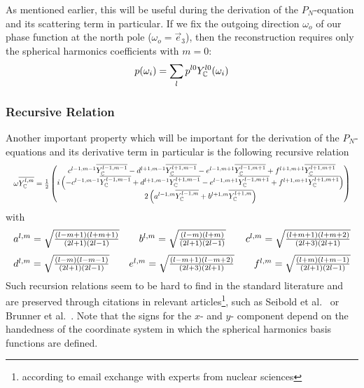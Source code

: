 As mentioned earlier, this will be useful during the derivation of the $P_N$-equation and its scattering term in particular. If we fix the outgoing direction $\omega_o$ of our phase function at the north pole ($\omega_o=\vec{e}_3$), then the reconstruction requires only the spherical harmonics coefficients with $m=0$:
\begin{align}
\label{eq:sh_exp_phase}
p(\omega_i) =
\sum_l
{
p^{l0}
Y_{\mathbb{C}}^{l0}(\omega_i)
}
\end{align}

\subsubsection*{Recursive Relation}

Another important property which will be important for the derivation of the $P_N$-equations and its derivative term in particular is the following recursive relation
\begin{equation}
\label{eq:recursive_relation}
\resizebox{1.0\hsize}{!}{$\omega\overline{\SHBC^{l,m}} = \frac{1}{2}
\begin{pmatrix}
\ c^{l-1, m-1}\overline{\SHBC^{l-1,m-1}} - d^{l+1, m-1}\overline{\SHBC^{l+1,m-1}} - e^{l-1, m+1}\overline{\SHBC^{l-1,m+1}} + f^{l+1, m+1}\overline{\SHBC^{l+1,m+1}}\\
i\left(-c^{l-1, m-1}\overline{\SHBC^{l-1,m-1}} + d^{l+1, m-1}\overline{\SHBC^{l+1,m-1}} - e^{l-1, m+1}\overline{\SHBC^{l-1,m+1}} + f^{l+1, m+1}\overline{\SHBC^{l+1,m+1}}\right) \\
2\left(a^{l-1, m}\overline{\SHBC^{l-1,m}}+b^{l+1, m}\overline{\SHBC^{l+1,m}}\right)
\end{pmatrix}$}
\end{equation}
with
\begin{equation*}
\resizebox{1.0\hsize}{!}{$
a^{l,m}= \sqrt{\frac{\left(l-m+1\right)\left(l+m+1\right)}{\left(2l+1\right)\left(2l-1\right)}} \qquad
b^{l,m}= \sqrt{\frac{\left(l-m\right)\left(l+m\right)}{\left(2l+1\right)\left(2l-1\right)}} \qquad
c^{l,m}= \sqrt{\frac{\left(l+m+1\right)\left(l+m+2\right)}{\left(2l+3\right)\left(2l+1\right)}}
$}
\end{equation*}
\begin{equation*}
\resizebox{1.0\hsize}{!}{$
d^{l,m}= \sqrt{\frac{\left(l-m\right)\left(l-m-1\right)}{\left(2l+1\right)\left(2l-1\right)}} \qquad
e^{l,m}= \sqrt{\frac{\left(l-m+1\right)\left(l-m+2\right)}{\left(2l+3\right)\left(2l+1\right)}} \qquad
f^{l,m}= \sqrt{\frac{\left(l+m\right)\left(l+m-1\right)}{\left(2l+1\right)\left(2l-1\right)}}
$}
\end{equation*}
Such recursion relations seem to be hard to find in the standard literature and are preserved through citations in relevant articles\footnote{according to email exchange with experts from nuclear sciences}, such as Seibold et al.~\cite{Seibold14} or Brunner et al.~\cite{Brunner05}. Note that the signs for the $x$- and $y$- component depend on the handedness of the coordinate system in which the spherical harmonics basis functions are defined.
